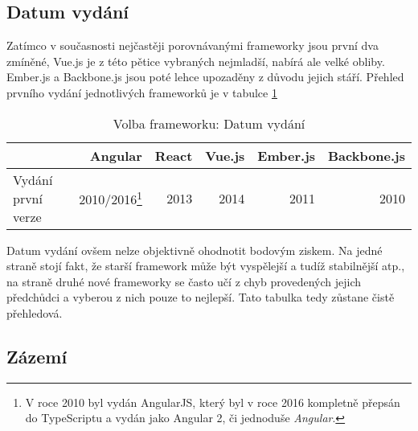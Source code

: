 
\subsection{Datum vydání}

Zatímco v současnosti nejčastěji porovnávanými frameworky jsou první dva zmíněné, Vue.js je z této pětice vybraných nejmladší, nabírá ale velké obliby. Ember.js a Backbone.js jsou poté lehce upozaděny z důvodu jejich stáří. Přehled prvního vydání jednotlivých frameworků je v tabulce \ref{table:compare:release}

\begin{table}[h]
\caption{Volba frameworku: Datum vydání}
\label{table:compare:release}
\begin{tabular}{lrrrrr}
\hline
                                         & Angular                     & React                     & Vue.js                     & Ember.js                     & Backbone.js               \\ \hline
Vydání první verze                       & 2010/2016\footnote{V roce 2010 byl vydán AngularJS, který byl v roce 2016 kompletně přepsán do TypeScriptu a vydán jako Angular 2, či jednoduše \emph{Angular}.}                                                                       & 2013                      & 2014                       & 2011                         & 2010                      \\
\end{tabular}
\end{table}

Datum vydání ovšem nelze objektivně ohodnotit bodovým ziskem. Na jedné straně stojí fakt, že starší framework může být vyspělejší a tudíž stabilnější atp., na straně druhé nové frameworky se často učí z chyb provedených jejich předchůdci a vyberou z nich pouze to nejlepší. Tato tabulka tedy zůstane čistě přehledová.


\subsection{Zázemí}

